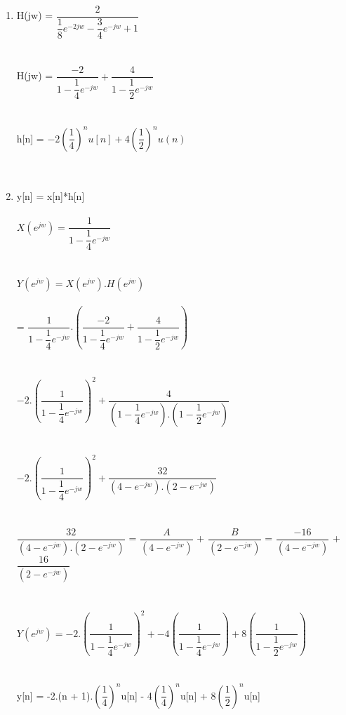 \documentclass[10pt,a4paper, margin=1in]{article}
\begin{document}
\begin{enumerate}
\begin{enumerate}
    \item %
    H(jw) = $\dfrac{2}{\dfrac{1}{8}e^{-2jw} - \dfrac{3}{4}e^{-jw} + 1} $  \\\\\\
    H(jw) = $\dfrac{-2}{1 - \dfrac{1}{4}e^{-jw}} + \dfrac{4}{1 - \dfrac{1}{2}e^{-jw}} $ \\\\\\
    h[n] = $-2(\dfrac{1}{4})^nu[n] + 4 (\dfrac{1}{2})^nu(n)$ \\\\\\
    
    \newpage
    \item %
    y[n] = x[n]*h[n]\\\\
    $X(e^{jw}) = \dfrac{1}{1- \dfrac{1}{4}e^{-jw}}$\\\\\\
    $Y(e^{jw}) = X(e^{jw}).H(e^{jw}) $\\\\
    = $ \dfrac{1}{1- \dfrac{1}{4}e^{-jw}} . (\dfrac{-2}{1 - \dfrac{1}{4}e^{-jw}} + \dfrac{4}{1 - \dfrac{1}{2}e^{-jw}})$\\\\\\
    $ -2.(\dfrac{1}{1- \dfrac{1}{4}e^{-jw}})^{2}  +   \dfrac{4}{ (1- \dfrac{1}{4}e^{-jw}).(1 - \dfrac{1}{2}e^{-jw})}$\\\\\\
    $ -2.(\dfrac{1}{1- \dfrac{1}{4}e^{-jw}})^{2}  +   \dfrac{32}{ (4 - e^{-jw}).(2 - e^{-jw})}$\\\\\\
    $\dfrac{32}{(4 - e^{-jw}).(2 - e^{-jw})}$ = $\dfrac{A}{(4 - e^{-jw})}$ + $\dfrac{B}{(2 - e^{-jw})}$ = $\dfrac{-16}{(4 - e^{-jw})}$ + $\dfrac{16}{(2 - e^{-jw})}$\\\\\\
    
    $Y(e^{jw}) = -2.(\dfrac{1}{1- \dfrac{1}{4}e^{-jw}})^{2} + -4(\dfrac{1}{1 - \dfrac{1}{4}e^{-jw}}) + 8(\dfrac{1}{1 - \dfrac{1}{2}e^{-jw}})$\\\\\\
   
    y[n] = -2.(n + 1).$(\dfrac{1}{4})^{n}$u[n] - 4$(\dfrac{1}{4})^{n}$u[n] + 8$(\dfrac{1}{2})^{n}$u[n]\\\\\\\\
    

\end{enumerate}
\end{enumerate}
\end{document}
